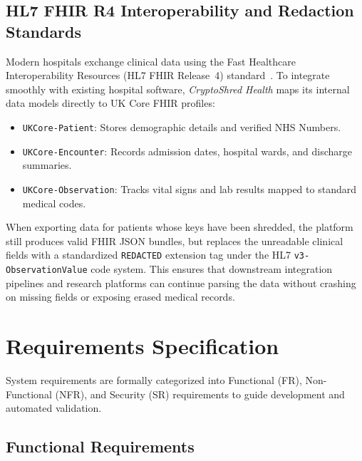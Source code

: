\subsection{HL7 FHIR R4 Interoperability and Redaction Standards}

Modern hospitals exchange clinical data using the Fast Healthcare Interoperability Resources (HL7 FHIR Release~4) standard~\cite{hl7_fhir_r4}. To integrate smoothly with existing hospital software, \textit{CryptoShred Health} maps its internal data models directly to UK Core FHIR profiles:
\begin{itemize}
    \item \texttt{UKCore-Patient}: Stores demographic details and verified NHS Numbers.
    \item \texttt{UKCore-Encounter}: Records admission dates, hospital wards, and discharge summaries.
    \item \texttt{UKCore-Observation}: Tracks vital signs and lab results mapped to standard medical codes.
\end{itemize}

When exporting data for patients whose keys have been shredded, the platform still produces valid FHIR JSON bundles, but replaces the unreadable clinical fields with a standardized \texttt{REDACTED} extension tag under the HL7 \texttt{v3-ObservationValue} code system. This ensures that downstream integration pipelines and research platforms can continue parsing the data without crashing on missing fields or exposing erased medical records.


\section{Requirements Specification}\label{section:requirements-specification}

System requirements are formally categorized into Functional (FR), Non-Functional (NFR), and Security (SR) requirements to guide development and automated validation.

\subsection{Functional Requirements}

